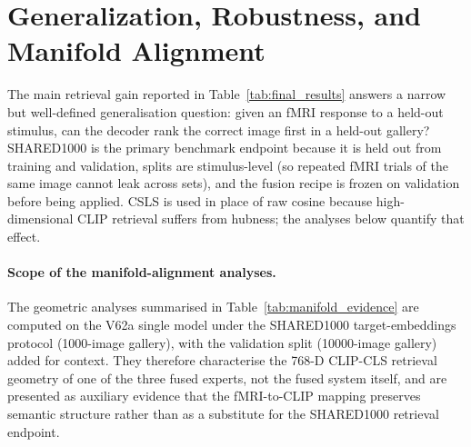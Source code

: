 \section{Generalization, Robustness, and Manifold Alignment}
\label{sec:generalization_manifold}

The main retrieval gain reported in Table~\ref{tab:final_results} answers a narrow but well-defined generalisation question: given an fMRI response to a held-out stimulus, can the decoder rank the correct image first in a held-out gallery? SHARED1000 is the primary benchmark endpoint because it is held out from training and validation, splits are stimulus-level (so repeated fMRI trials of the same image cannot leak across sets), and the fusion recipe is frozen on validation before being applied. CSLS is used in place of raw cosine because high-dimensional CLIP retrieval suffers from hubness; the analyses below quantify that effect.

\paragraph{Scope of the manifold-alignment analyses.} The geometric analyses summarised in Table~\ref{tab:manifold_evidence} are computed on the V62a single model under the SHARED1000 target-embeddings protocol (1000-image gallery), with the validation split (10000-image gallery) added for context. They therefore characterise the 768-D CLIP-CLS retrieval geometry of one of the three fused experts, not the fused system itself, and are presented as auxiliary evidence that the fMRI-to-CLIP mapping preserves semantic structure rather than as a substitute for the SHARED1000 retrieval endpoint.

